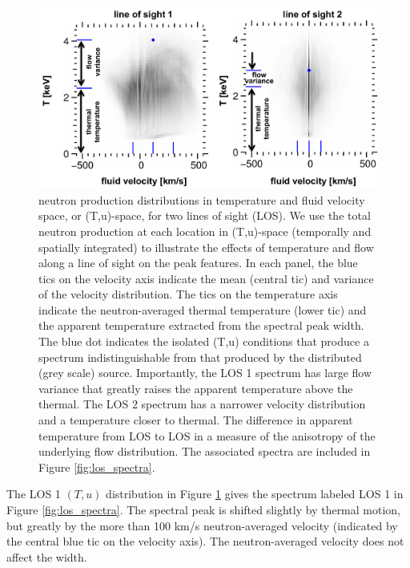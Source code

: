 \documentclass[aip,pop,numerical,reprint,floatfix]{revtex4-1}
\begin{document}
\begin{figure}[h]
\begin{centering}
\includegraphics[width=0.8\paperwidth]{tudist}
\par\end{centering}
\caption{\label{fig:tu_distribution}neutron production distributions in temperature and fluid velocity space, or (T,u)-space, for two lines of sight (LOS). We use the total neutron production at each location in (T,u)-space (temporally and spatially integrated) to illustrate the effects of temperature and flow along a line of sight on the peak features. In each panel, the blue tics on the velocity axis indicate the mean (central tic) and variance of the velocity distribution. The tics on the temperature axis indicate the neutron-averaged thermal temperature (lower tic) and the apparent temperature extracted from the spectral peak width. The blue dot indicates the isolated (T,u) conditions that produce a spectrum indistinguishable from that produced by the distributed (grey scale) source. Importantly, the LOS 1 spectrum has large flow variance that greatly raises the apparent temperature above the thermal. The LOS 2 spectrum has a narrower velocity distribution and a temperature closer to thermal. The difference in apparent temperature from LOS to LOS in a measure of the anisotropy of the underlying flow distribution. The associated spectra are included in Figure \ref{fig:los_spectra}.}
\end{figure}

The LOS 1 $(T,u)$ distribution in Figure \ref{fig:tu_distribution} gives
the spectrum labeled LOS 1 in Figure \ref{fig:los_spectra}. The spectral
peak is shifted slightly by thermal motion, but greatly by the more
than 100 km/s neutron-averaged velocity (indicated by the central
blue tic on the velocity axis). The neutron-averaged velocity does
not affect the width. 
\end{document}
